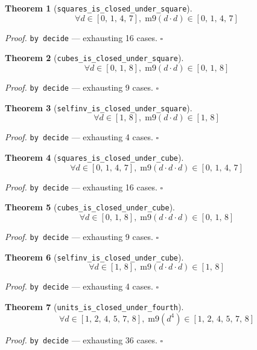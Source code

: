 \documentclass[11pt]{article}
\newtheorem{theorem}{Theorem}[section]
\begin{document}
\begin{theorem}[\texttt{squares\_is\_closed\_under\_square}]
\[ \forall d \in [0,\,1,\,4,\,7],\; \mathrm{m9}\mathopen{}\left(d \cdot d\right) \in [0,\,1,\,4,\,7] \]
\end{theorem}
\noindent\emph{Proof.} \texttt{by decide} --- exhausting 16 cases. \hfill$\square$

\begin{theorem}[\texttt{cubes\_is\_closed\_under\_square}]
\[ \forall d \in [0,\,1,\,8],\; \mathrm{m9}\mathopen{}\left(d \cdot d\right) \in [0,\,1,\,8] \]
\end{theorem}
\noindent\emph{Proof.} \texttt{by decide} --- exhausting 9 cases. \hfill$\square$

\begin{theorem}[\texttt{selfinv\_is\_closed\_under\_square}]
\[ \forall d \in [1,\,8],\; \mathrm{m9}\mathopen{}\left(d \cdot d\right) \in [1,\,8] \]
\end{theorem}
\noindent\emph{Proof.} \texttt{by decide} --- exhausting 4 cases. \hfill$\square$

\begin{theorem}[\texttt{squares\_is\_closed\_under\_cube}]
\[ \forall d \in [0,\,1,\,4,\,7],\; \mathrm{m9}\mathopen{}\left(d \cdot d \cdot d\right) \in [0,\,1,\,4,\,7] \]
\end{theorem}
\noindent\emph{Proof.} \texttt{by decide} --- exhausting 16 cases. \hfill$\square$

\begin{theorem}[\texttt{cubes\_is\_closed\_under\_cube}]
\[ \forall d \in [0,\,1,\,8],\; \mathrm{m9}\mathopen{}\left(d \cdot d \cdot d\right) \in [0,\,1,\,8] \]
\end{theorem}
\noindent\emph{Proof.} \texttt{by decide} --- exhausting 9 cases. \hfill$\square$

\begin{theorem}[\texttt{selfinv\_is\_closed\_under\_cube}]
\[ \forall d \in [1,\,8],\; \mathrm{m9}\mathopen{}\left(d \cdot d \cdot d\right) \in [1,\,8] \]
\end{theorem}
\noindent\emph{Proof.} \texttt{by decide} --- exhausting 4 cases. \hfill$\square$

\begin{theorem}[\texttt{units\_is\_closed\_under\_fourth}]
\[ \forall d \in [1,\,2,\,4,\,5,\,7,\,8],\; \mathrm{m9}\mathopen{}\left(d^{4}\right) \in [1,\,2,\,4,\,5,\,7,\,8] \]
\end{theorem}
\noindent\emph{Proof.} \texttt{by decide} --- exhausting 36 cases. \hfill$\square$
\end{document}
